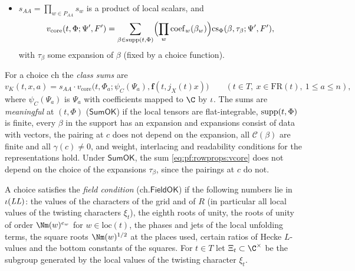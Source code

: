 \begin{definition}
\begin{itemize}
\begin{equation}\label{eq:pf:rowprops:classsum}
\rowpropsclass_\Phi(\beta,\tau;\Psi',F')=\sum_{c\in\mathcal C(\beta)}\gamma(c)\,
\bigl\langle\Psi'(\mathrm{pt}(c)_0),F'(\mathrm{pt}(c)_0)\bigr\rangle_{\tau,c}
\end{equation}
for vector-valued functions $\Psi'$ on the finite points of $G_{V_{\mathrm t_0}}$ and $F'$ on those of $G_{X'}$;
\item $s_{AA}=\prod_{w\in P_{AA}}s_w$ is a product of local scalars, and
\begin{equation}\label{eq:pf:rowprops:vcore}
v_{\mathrm{core}}(t,\Phi;\Psi',F')=\sum_{\beta\in\mathrm{supp}(t,\Phi)}\Bigl(\prod_w\mathrm{coef}_w(\beta_w)\Bigr)
\mathrm{cs}_\Phi(\beta,\tau_\beta;\Psi',F'),
\end{equation}
with $\tau_\beta$ some expansion of $\beta$ (fixed by a choice function).
\end{itemize}
For a choice $\mathrm{ch}$ the \emph{class sums} are
\[
v_K(t,x,a)=s_{AA}\cdot v_{\mathrm{core}}\bigl(t,\Phi_a;\psi_C(\Psi_a),\mathbf{f}(t,j_X(t)x)\bigr)
\qquad(t\in T,\ x\in\mathrm{FR}(t),\ 1\le a\le n),
\]
where $\psi_C(\Psi_a)$ is $\Psi_a$ with coefficients mapped to $\C$ by $\iota$. The sums are \emph{meaningful} at
$(t,\Phi)$ ($\mathsf{SumOK}$) if the local tensors are flat-integrable, $\mathrm{supp}(t,\Phi)$ is finite, every
$\beta$ in the support has an expansion and expansions consist of data with vectors, the pairing at $c$ does not depend
on the expansion, all $\mathcal C(\beta)$ are finite and all $\gamma(c)\ne0$, and weight, interlacing and readability
conditions for the representations hold. Under $\mathsf{SumOK}$, the sum \eqref{eq:pf:rowprops:vcore} does not depend
on the choice of the expansions $\tau_\beta$, since the pairings at $c$ do not.
\end{definition}

\begin{definition}\label{def:pf:rowprops:field}
A choice satisfies the \emph{field condition} ($\mathrm{ch}.\mathsf{FieldOK}$) if the following numbers lie in
$\iota(\mathit{LL})$: the values of the characters of the grid and of $R$ (in particular all local values of
the twisting characters $\xi_t$), the eighth roots of unity, the roots of unity of order $\Nm(w)^{e_w}$ for
$w\in\mathrm{loc}(t)$, the phases and jets of the local unfolding terms, the square roots $\Nm(w)^{1/2}$ at the places
used, certain ratios of Hecke $L$-values and the bottom constants of the squares. For $t\in T$ let
$\rowpropsXi_t\subset\C^\times$ be the subgroup generated by the local values of the twisting character $\xi_t$.
\end{definition}

